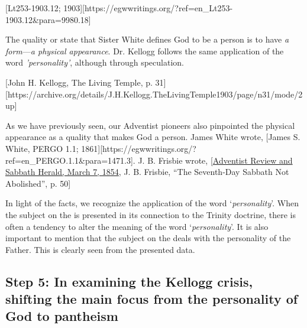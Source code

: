 [Lt253-1903.12; 1903][https://egwwritings.org/?ref=en\_Lt253-1903.12&para=9980.18]

The quality or state that Sister White defines God to be a person is to have \textit{a form}—\textit{a physical appearance}. Dr. Kellogg follows the same application of the word \textit{'personality'}, although through speculation.

[John H. Kellogg, The Living Temple, p. 31][https://archive.org/details/J.H.Kellogg.TheLivingTemple1903/page/n31/mode/2up]

As we have previously seen, our Adventist pioneers also pinpointed the physical appearance as a quality that makes God a person. James White wrote, [James S. White, PERGO 1.1; 1861][https://egwwritings.org/?ref=en\_PERGO.1.1&para=1471.3]. J. B. Frisbie wrote, [\href{https://documents.adventistarchives.org/Periodicals/RH/RH18540307-V05-07.pdf}{Adventist Review and Sabbath Herald, March 7, 1854}, J. B. Frisbie, “The Seventh-Day Sabbath Not Abolished”, p. 50]

In light of the facts, we recognize the application of the word ‘\textit{personality}’. When the subject on the  is presented in its connection to the Trinity doctrine, there is often a tendency to alter the meaning of the word ‘\textit{personality}’. It is also important to mention that the subject on the  deals with the personality of the Father. This is clearly seen from the presented data.

\subsection*{Step 5: In examining the Kellogg crisis, shifting the main focus from the personality of God to pantheism}

